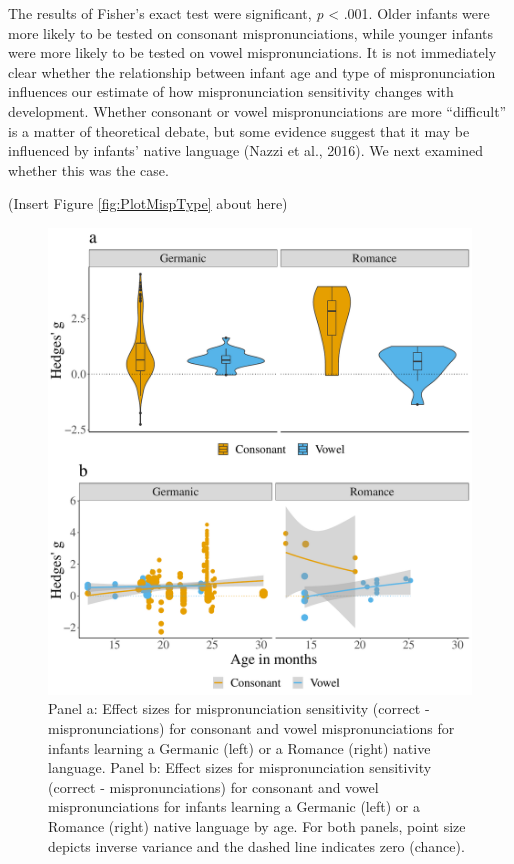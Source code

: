 \documentclass[man]{apa6}
\begin{document}
The results of Fisher's exact test were significant, \emph{p} \textless{} .001. Older infants were more likely to be tested on consonant mispronunciations, while younger infants were more likely to be tested on vowel mispronunciations. It is not immediately clear whether the relationship between infant age and type of mispronunciation influences our estimate of how mispronunciation sensitivity changes with development. Whether consonant or vowel mispronunciations are more \enquote{difficult} is a matter of theoretical debate, but some evidence suggest that it may be influenced by infants' native language (Nazzi et al., 2016). We next examined whether this was the case.

(Insert Figure \ref{fig:PlotMispType} about here)

\begin{figure}
\centering
\includegraphics{VonHolzenBergmann_MPMetaAnalysis_files/figure-latex/PlotCVEffectLang-1.pdf}
\caption{\label{fig:PlotCVEffectLang}Panel a: Effect sizes for mispronunciation sensitivity (correct - mispronunciations) for consonant and vowel mispronunciations for infants learning a Germanic (left) or a Romance (right) native language. Panel b: Effect sizes for mispronunciation sensitivity (correct - mispronunciations) for consonant and vowel mispronunciations for infants learning a Germanic (left) or a Romance (right) native language by age. For both panels, point size depicts inverse variance and the dashed line indicates zero (chance).}
\end{figure}
\end{document}
